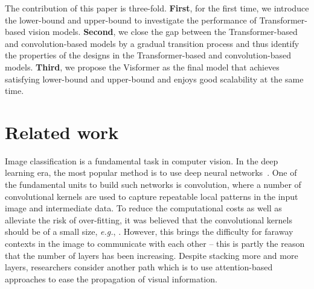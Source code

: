 \documentclass[10pt,twocolumn,letterpaper]{article}
\begin{document}
The contribution of this paper is three-fold. \textbf{First}, for the first time, we introduce the lower-bound and upper-bound to investigate the performance of Transformer-based vision models. \textbf{Second}, we close the gap between the Transformer-based and convolution-based models by a gradual transition process and thus identify the properties of the designs in the Transformer-based and convolution-based models. \textbf{Third}, we propose the Visformer as the final model that achieves satisfying lower-bound and upper-bound and enjoys good scalability at the same time.

\section{Related work}

Image classification is a fundamental task in computer vision. In the deep learning era, the most popular method is to use deep neural networks~\cite{krizhevsky2012imagenet,simonyan2014very,he2016deep}. One of the fundamental units to build such networks is convolution, where a number of convolutional kernels are used to capture repeatable local patterns in the input image and intermediate data. To reduce the computational costs as well as alleviate the risk of over-fitting, it was believed that the convolutional kernels should be of a small size, \textit{e.g.}, . However, this brings the difficulty for faraway contexts in the image to communicate with each other -- this is partly the reason that the number of layers has been increasing. Despite stacking more and more layers, researchers consider another path which is to use attention-based approaches to ease the propagation of visual information.
\end{document}
